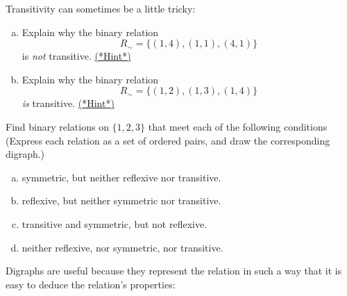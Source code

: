 %

Transitivity can sometimes be a little tricky:

\begin{exercise}\label{exercise:EquivalenceRelationsChap:trickyTransitive}
\begin{enumerate}[(a)]
\item
Explain why the binary relation 
\[ R_{\sim} = \{(1,4), (1,1),(4,1) \} \]
is \emph{not} transitive.
\hyperref[sec:EquivalenceRelationsChap:hints]{(*Hint*)} 
\item
Explain why the binary relation 
\[ R_{\sim} = \{(1,2), (1,3),(1,4) \} \]
\emph{is} transitive.
\hyperref[sec:EquivalenceRelationsChap:hints]{(*Hint*)}
\end{enumerate}
\end{exercise}

\begin{exer} \label{BinRelSomePropsEx}
Find binary relations on $\{1,2,3\}$ that meet each of the following conditions 
(Express each relation as a set of ordered pairs, and draw the corresponding digraph.)
\begin{enumerate}[(a)]
\item \label{BinRelSomePropsEx-symmonly}
symmetric, but neither reflexive nor transitive.
\item \label{BinRelSomePropsEx-refonly}
 reflexive, but neither symmetric nor transitive.
\item \label{BinRelSomePropsEx-transandsymm}
transitive and symmetric, but not reflexive.
\item \label{BinRelSomePropsEx-none}
neither reflexive, nor symmetric, nor transitive.
\end{enumerate}
\end{exer}
Digraphs are useful because they represent the relation in such a way that it is easy to deduce the relation's properties: 

